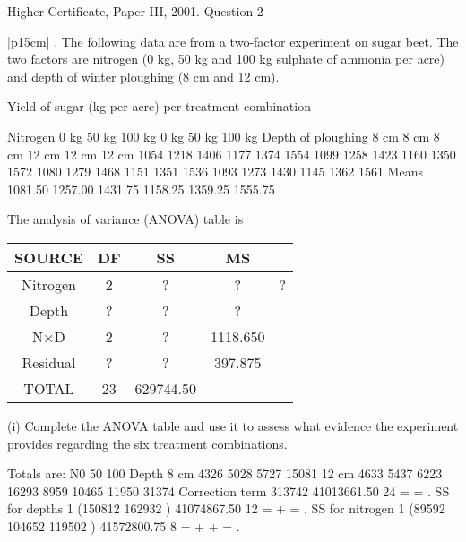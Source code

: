 \documentclass[a4paper,12pt]{article}
\begin{document}


Higher Certificate, Paper III, 2001. Question 2

\begin{table}[ht!]
\centering
\begin{tabular}{|p{15cm}|}
. The following data are from a two-factor experiment on sugar beet.  The two factors are nitrogen (0 kg, 50 kg and 100 kg sulphate of ammonia per acre) and depth of winter ploughing (8 cm and 12 cm). 
 
 
Yield of sugar (kg per acre) per treatment combination 
 
Nitrogen 0 kg 50 kg 100 kg 0 kg 50 kg 100 kg Depth of ploughing 8 cm 8 cm 8 cm 12 cm 12 cm 12 cm 1054 1218 1406 1177 1374 1554 1099 1258 1423 1160 1350 1572 1080 1279 1468 1151 1351 1536 1093 1273 1430 1145 1362 1561 Means 1081.50 1257.00 1431.75 1158.25 1359.25 1555.75 
 
 
 
The analysis of variance (ANOVA) table is 

\begin{center}
    \begin{tabular}{|c|c|c|c|c|}
 SOURCE & DF &  SS & MS & \\ \hline
Nitrogen & 2 & ? & ? & ? \\ \hline
Depth & ? & ? & ? & \\ \hline
N×D & 2 & ? & 1118.650 & \\ \hline
Residual & ? & ? & 397.875 & \\ \hline
TOTAL & 23 & 629744.50  & & \\ \hline
    
    \end{tabular}
\end{center} 
 
(i) Complete the ANOVA table and use it to assess what evidence the experiment provides regarding the six treatment combinations.
\\ \hline
\end{tabular}
\end{table}



Totals are:
N0 50 100
Depth 8 cm 4326 5028 5727 15081 12 cm 4633 5437 6223 16293
8959 10465 11950 31374
Correction term
313742 41013661.50
24
= = .
SS for depths 1 (150812 162932 ) 41074867.50
12
= + = .
SS for nitrogen 1 (89592 104652 119502 ) 41572800.75
8
= + + = .
\end{document}
